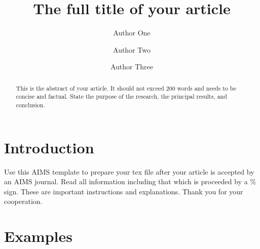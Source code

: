 \documentclass{main}
\title{The full title of your article}
\author[a,b,1]{Author One}
\author[c,1,2]{Author Two}
\author[a,2]{Author Three}
\affil[a]{Affiliation One}
\affil[b]{Affiliation Two}
\affil[c]{Affiliation Three}
\begin{document}

\maketitle


\marginpar{
  \begin{mdframed}[style = dcdscsigstyle]
    \small \RaggedRight
    \section*{\textcolor{dcdscbluetext}{Significance}}
    \lipsum[2]
  \end{mdframed}
}



\begin{abstract}
  This is the abstract of your article. It should not exceed 200 words and
  needs to be concise and factual. State the purpose of the research, the
  principal results, and conclusion.
\end{abstract}
\lipsum[1-3]

\section{Introduction}
Use this AIMS template to prepare your tex file after your article is accepted by an AIMS journal. Read all information including that which is proceeded by a \% sign. These are important instructions and explanations. Thank you for your cooperation.



\section{Examples}
\end{document}
